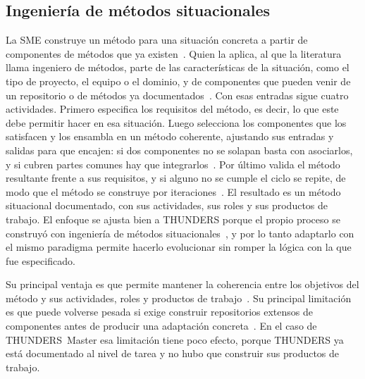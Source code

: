 \documentclass[12pt,letterpaper,oneside]{report}
\begin{document}
\subsection{Ingeniería de métodos situacionales}
La SME construye un método para una situación concreta a partir de componentes
de métodos que ya existen~\cite{henderson2010sme}. Quien la aplica, al que la
literatura llama ingeniero de métodos, parte de las características de la
situación, como el tipo de proyecto, el equipo o el dominio, y de componentes
que pueden venir de un repositorio o de métodos ya
documentados~\cite{brinkkemper1996method}. Con esas entradas sigue cuatro
actividades. Primero especifica los requisitos del método, es decir, lo que este
debe permitir hacer en esa situación. Luego selecciona los componentes que los
satisfacen y los ensambla en un método coherente, ajustando sus entradas y
salidas para que encajen: si dos componentes no se solapan basta con asociarlos,
y si cubren partes comunes hay que integrarlos~\cite{ralyte2001assembly}. Por
último valida el método resultante frente a sus requisitos, y si alguno no se
cumple el ciclo se repite, de modo que el método se construye por
iteraciones~\cite{ralyte2001assembly,henderson2014}. El resultado es un método
situacional documentado, con sus actividades, sus roles y sus productos de
trabajo. El enfoque se ajusta bien a THUNDERS porque el propio proceso se construyó con
ingeniería de métodos situacionales~\cite{agredo2022thesis}, y por lo tanto adaptarlo con el mismo
paradigma permite hacerlo evolucionar sin romper la lógica con la que fue
especificado.

Su principal ventaja es que permite mantener la coherencia entre los objetivos
del método y sus actividades, roles y productos de trabajo~\cite{henderson2014}. Su principal limitación es que puede volverse
pesada si exige construir repositorios extensos de componentes antes de
producir una adaptación concreta~\cite{henderson2010sme}. En el caso de THUNDERS~Master esa limitación tiene poco efecto, porque THUNDERS
ya está documentado al nivel de tarea y no hubo que construir sus productos de trabajo.
\end{document}
